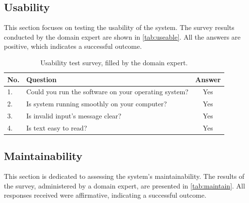 \documentclass[12pt, titlepage]{article}
\begin{document}
\subsection{Usability}
This section focuses on testing the usability of the system. 
The survey results conducted by the domain expert are shown in \autoref{tab:useable}.
All the answers are positive, which indicates a successful outcome.

\begin{table}[!h]
  \centering
  \caption{Usability test survey, filled by the domain expert.}
  \label{tab:useable}
  \begin{tabular}{ p{0.5cm}|p{10cm}|c}
    \hline
    No. & Question                                             & Answer \\
    \hline
    1.  & Could you run the software on your operating system? & Yes    \\
    2.  & Is system running smoothly on your computer?         & Yes    \\
    3.  & Is invalid input's message clear?                    & Yes    \\
    4.  & Is text easy to read?                                & Yes    \\
    \hline
  \end{tabular}
\end{table}

\subsection{Maintainability}
This section is dedicated to assessing the system's maintainability. 
The results of the survey, administered by a domain expert, 
are presented in \autoref{tab:maintain}. All responses received were affirmative, 
indicating a successful outcome.
\end{document}
